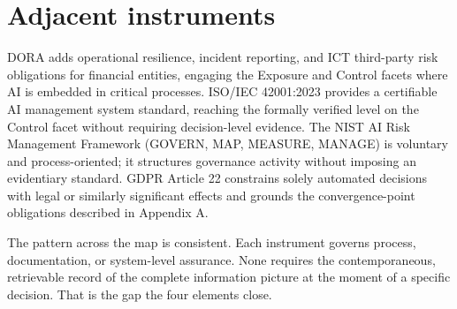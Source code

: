 \section{Adjacent instruments}

DORA adds operational resilience, incident reporting, and ICT third-party risk obligations for financial entities, engaging the Exposure and Control facets where AI is embedded in critical processes. ISO/IEC 42001:2023 provides a certifiable AI management system standard, reaching the formally verified level on the Control facet without requiring decision-level evidence. The NIST AI Risk Management Framework (GOVERN, MAP, MEASURE, MANAGE) is voluntary and process-oriented; it structures governance activity without imposing an evidentiary standard. GDPR Article 22 constrains solely automated decisions with legal or similarly significant effects and grounds the convergence-point obligations described in Appendix A.

The pattern across the map is consistent. Each instrument governs process, documentation, or system-level assurance. None requires the contemporaneous, retrievable record of the complete information picture at the moment of a specific decision. That is the gap the four elements close.
